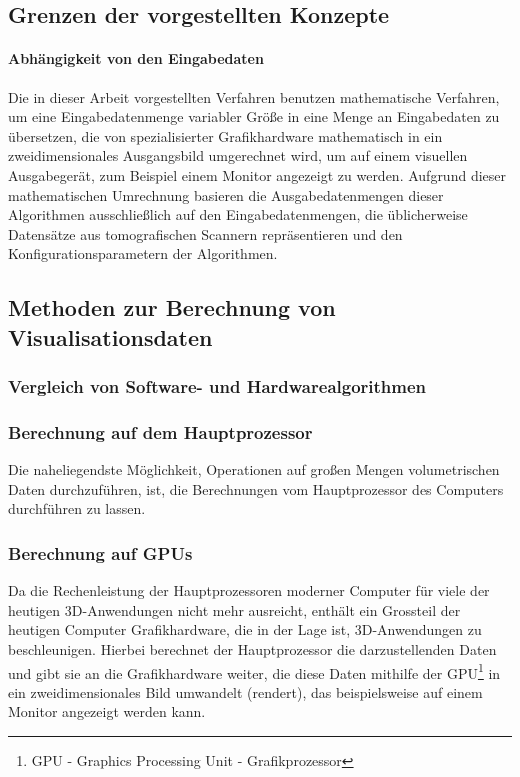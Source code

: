\documentclass[a4paper,titlepage,12pt]{scrartcl}
\begin{document}
\subsection{Grenzen der vorgestellten Konzepte}\label{ssec:limits}
\paragraph{Abhängigkeit von den Eingabedaten}
Die in dieser Arbeit vorgestellten Verfahren benutzen mathematische Verfahren, um eine Eingabedatenmenge variabler Größe in eine Menge an Eingabedaten zu übersetzen, die von spezialisierter Grafikhardware mathematisch in ein zweidimensionales Ausgangsbild umgerechnet wird, um auf einem visuellen Ausgabegerät, zum Beispiel einem Monitor angezeigt zu werden. Aufgrund dieser mathematischen Umrechnung basieren die Ausgabedatenmengen dieser Algorithmen ausschließlich auf den Eingabedatenmengen, die üblicherweise Datensätze aus tomografischen Scannern repräsentieren und den Konfigurationsparametern der Algorithmen.
\subsection{Methoden zur Berechnung von Visualisationsdaten}
\subsubsection{Vergleich von Software- und Hardwarealgorithmen}\label{ssec:swhwcomparison}

\subsubsection{Berechnung auf dem Hauptprozessor}\label{sssec:cpucalculation}
Die naheliegendste Möglichkeit, Operationen auf großen Mengen volumetrischen Daten durchzuführen, ist, die Berechnungen vom Hauptprozessor des Computers durchführen zu lassen. 
\subsubsection{Berechnung auf GPUs}\label{sssec:gpucalculation}
Da die Rechenleistung der Hauptprozessoren moderner Computer für viele der heutigen 3D-Anwendungen nicht mehr ausreicht, enthält ein Grossteil der heutigen Computer Grafikhardware, die in der Lage ist, 3D-Anwendungen zu beschleunigen. Hierbei berechnet der Hauptprozessor die darzustellenden Daten und gibt sie an die Grafikhardware weiter, die diese Daten mithilfe der GPU\footnote{GPU - Graphics Processing Unit - Grafikprozessor} in ein zweidimensionales Bild umwandelt (rendert), das beispielsweise auf einem Monitor angezeigt werden kann.
\end{document}
